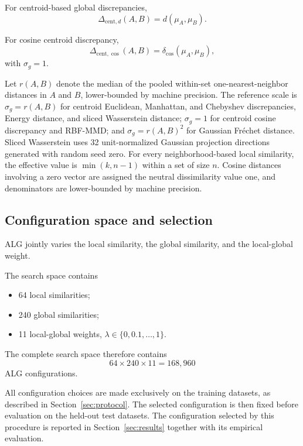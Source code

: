 \documentclass[preprint,12pt]{elsarticle}
\newcommand{\deltacos}{\delta_{\mathrm{cos}}}
\begin{document}
For centroid-based global discrepancies,
\begin{equation}
\Delta_{\mathrm{cent},d}(A,B)
=
d(\mu_A,\mu_B).
\label{eq:centroid-global}
\end{equation}

For cosine centroid discrepancy,
\[
\Delta_{\mathrm{cent},\cos}(A,B)
=
\deltacos(\mu_A,\mu_B),
\]
with $\sigma_g=1$.

Let $r(A,B)$ denote the median of the pooled within-set one-nearest-neighbor
distances in $A$ and $B$, lower-bounded by machine precision. The reference
scale is $\sigma_g=r(A,B)$ for centroid Euclidean, Manhattan, and Chebyshev
discrepancies, Energy distance, and sliced Wasserstein distance;
$\sigma_g=1$ for centroid cosine discrepancy and RBF-MMD; and
$\sigma_g=r(A,B)^2$ for Gaussian Fr\'echet distance. Sliced Wasserstein uses
32 unit-normalized Gaussian projection directions generated with random seed
zero. For every neighborhood-based local similarity, the effective value is
$\min(k,n-1)$ within a set of size $n$. Cosine distances involving a zero
vector are assigned the neutral dissimilarity value one, and denominators are
lower-bounded by machine precision.

\subsection{Configuration space and selection}

ALG jointly varies the local similarity, the global similarity, and the
local-global weight.

The search space contains
\begin{itemize}
    \item 64 local similarities;
    \item 240 global similarities;
    \item 11 local-global weights,
    $\lambda\in\{0,0.1,\ldots,1\}$.
\end{itemize}

The complete search space therefore contains
\begin{equation}
64\times240\times11
=
168{,}960
\label{eq:configuration-space}
\end{equation}
ALG configurations.

All configuration choices are made exclusively on the training datasets,
as described in Section~\ref{sec:protocol}. The selected configuration is
then fixed before evaluation on the held-out test datasets. The configuration
selected by this procedure is reported in Section~\ref{sec:results} together
with its empirical evaluation.
\end{document}
